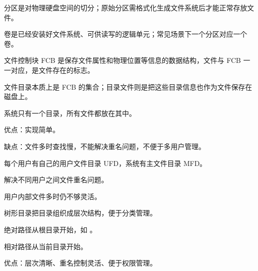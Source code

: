 \begin{points}
  \item 分区是对物理硬盘空间的切分；原始分区需格式化生成文件系统后才能正常存放文件。
  \item 卷是已经安装好文件系统、可供读写的逻辑单元；常见场景下一个分区对应一个卷。
  \item 文件控制块 FCB 是保存文件属性和物理位置等信息的数据结构，文件与 FCB 一一对应，是文件存在的标志。
  \item 文件目录本质上是 FCB 的集合；目录文件则是把这些目录信息也作为文件保存在磁盘上。
\end{points}


\begin{points}
  \item 系统只有一个目录，所有文件都放在其中。
  \item 优点：实现简单。
  \item 缺点：文件多时查找慢，不能解决重名问题，不便于多用户管理。
\end{points}


\begin{points}
  \item 每个用户有自己的用户文件目录 UFD，系统有主文件目录 MFD。
  \item 解决不同用户之间文件重名问题。
  \item 用户内部文件多时仍不够灵活。
\end{points}


\begin{points}
  \item 树形目录把目录组织成层次结构，便于分类管理。
  \item 绝对路径从根目录开始，如 。
  \item 相对路径从当前目录开始。
  \item 优点：层次清晰、重名控制灵活、便于权限管理。
\end{points}

